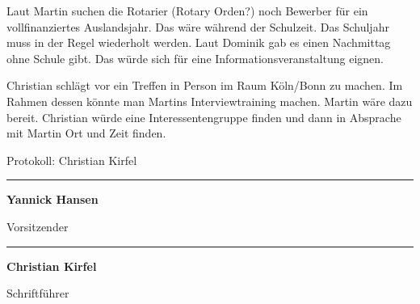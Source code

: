 \documentclass[a4paper, 11pt]{article}
\newcommand\signature[2]{%
\noindent\begin{minipage}{5cm}
    \noindent\vspace{3cm}\par
    \noindent\rule{5cm}{1pt}\par
    \noindent\textbf{#1}\par
    \noindent#2%
\end{minipage}}
\begin{document}
Laut Martin suchen die Rotarier (Rotary Orden?) noch Bewerber für ein vollfinanziertes Auslandsjahr. Das wäre während der Schulzeit.
Das Schuljahr muss in der Regel wiederholt werden.
Laut Dominik gab es einen Nachmittag ohne Schule gibt. Das würde sich für eine Informationsveranstaltung eignen.

Christian schlägt vor ein Treffen in Person im Raum Köln/Bonn zu machen.
Im Rahmen dessen könnte man Martins Interviewtraining machen.
Martin wäre dazu bereit. Christian würde eine Interessentengruppe finden und dann in Absprache mit Martin Ort und Zeit finden.

\newpage

Protokoll: Christian Kirfel


\signature{Yannick Hansen}{Vorsitzender}\hfill\signature{Christian Kirfel}{Schriftführer}
\end{document}
